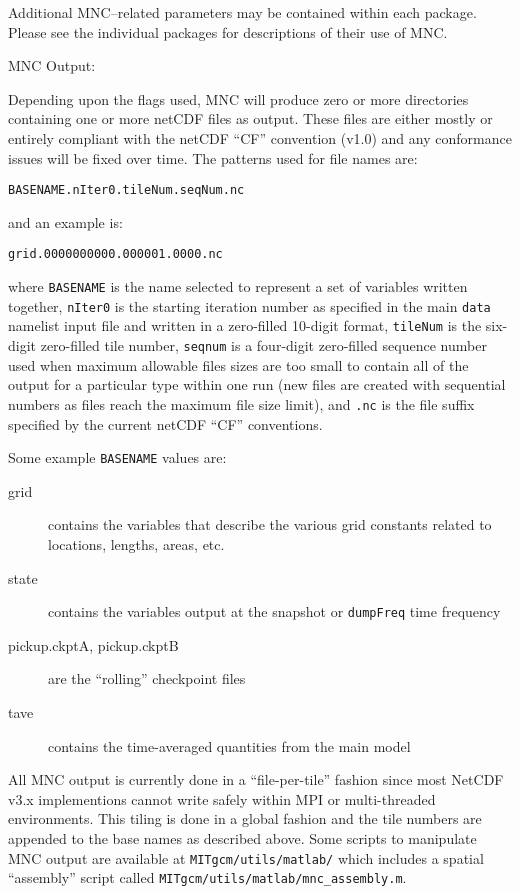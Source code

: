 Additional MNC--related parameters may be contained within each
package.  Please see the individual packages for descriptions of their
use of MNC.


MNC Output:

Depending upon the flags used, MNC will produce zero or more
directories containing one or more netCDF files as output.  These
files are either mostly or entirely compliant with the netCDF ``CF''
convention (v1.0) and any conformance issues will be fixed over time.
The patterns used for file names are:
\begin{center}
\texttt{BASENAME.nIter0.tileNum.seqNum.nc}
\end{center}
and an example is:
\begin{center}
\texttt{grid.0000000000.000001.0000.nc}
\end{center}
where \texttt{BASENAME} is the name selected to represent a set of
variables written together, \texttt{nIter0} is the starting iteration
number as specified in the main \texttt{data} namelist input file and
written in a zero-filled 10-digit format, \texttt{tileNum} is the
six-digit zero-filled tile number, \texttt{seqnum} is a four-digit
zero-filled sequence number used when maximum allowable files sizes
are too small to contain all of the output for a particular type
within one run (new files are created with sequential numbers as files
reach the maximum file size limit), and \texttt{.nc} is the file
suffix specified by the current netCDF ``CF'' conventions.

Some example \texttt{BASENAME} values are:
\begin{description}
\item[grid] contains the variables that describe the various grid
  constants related to locations, lengths, areas, etc.
\item[state] contains the variables output at the snapshot or
  \texttt{dumpFreq} time frequency
\item[pickup.ckptA, pickup.ckptB] are the ``rolling'' checkpoint files
\item[tave] contains the time-averaged quantities from the main model
\end{description}

All MNC output is currently done in a ``file-per-tile'' fashion since
most NetCDF v3.x implementions cannot write safely within MPI or
multi-threaded environments.  This tiling is done in a global fashion
and the tile numbers are appended to the base names as described
above.  Some scripts to manipulate MNC output are available at
\texttt{MITgcm/utils/matlab/} which includes a spatial ``assembly''
script called \texttt{MITgcm/utils/matlab/mnc\_assembly.m}.

